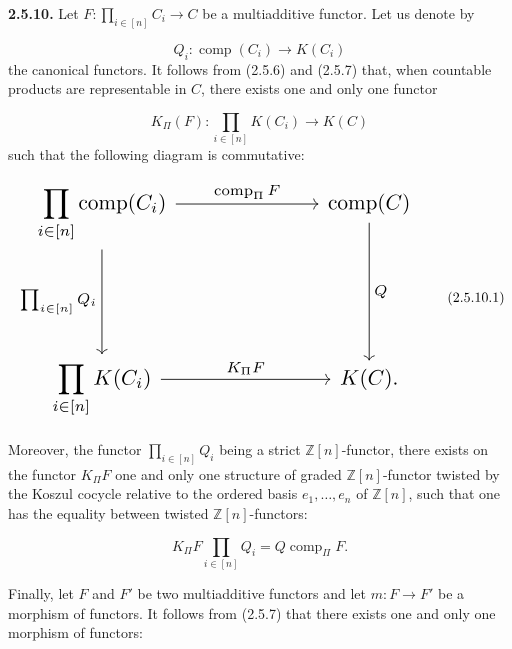 %
\noindent\textbf{2.5.10.}\quad
{}
Let
$F\colon\prod_{i\in[n]}C_i\longrightarrow C$ be a multiadditive functor.
Let us denote by

\begin{equation*}
  Q_i\colon\operatorname{comp}(C_i)\longrightarrow K(C_i)
\end{equation*}
the canonical functors. It follows from (2.5.6) and (2.5.7) that, when
countable products are representable in $C$, there exists one and only one
functor

\begin{equation*}
  K_{\Pi}(F)\colon
  \prod_{i\in[n]}K(C_i)\longrightarrow K(C)
\end{equation*}
such that the following diagram is commutative:

\begin{equation}
  \resizebox{0.84\textwidth}{!}{%
    $\begin{tikzcd}[ampersand replacement=\&,column sep=6.8em,row sep=5.0em]
      \displaystyle\prod_{i\in[n]}\operatorname{comp}(C_i)
        \arrow[r,"{\operatorname{comp}_{\Pi}F}"]
        \arrow[d,"{\prod_{i\in[n]}Q_i}"']
        \& \operatorname{comp}(C)
          \arrow[d,"Q"] \\
      \displaystyle\prod_{i\in[n]}K(C_i)
        \arrow[r,"{K_{\Pi}F}"]
        \& K(C)\mathpunct{.}
    \end{tikzcd}$%
  }
  \tag{2.5.10.1}
\end{equation}

Moreover, the functor $\prod_{i\in[n]}Q_i$ being a strict
$\mathbb Z[n]$-functor, there exists on the functor $K_{\Pi}F$ one and only
one structure of graded $\mathbb Z[n]$-functor twisted by the Koszul cocycle
relative to the ordered basis $e_1,\ldots,e_n$ of $\mathbb Z[n]$, such that
one has the equality between twisted $\mathbb Z[n]$-functors:

\begin{equation}
  K_{\Pi}F\prod_{i\in[n]}Q_i
  =Q\operatorname{comp}_{\Pi}F.
  \tag{2.5.10.2}
\end{equation}

Finally, let $F$ and $F'$ be two multiadditive functors and let
$m\colon F\longrightarrow F'$ be a morphism of functors. It follows from
(2.5.7) that there exists one and only one morphism of functors:

